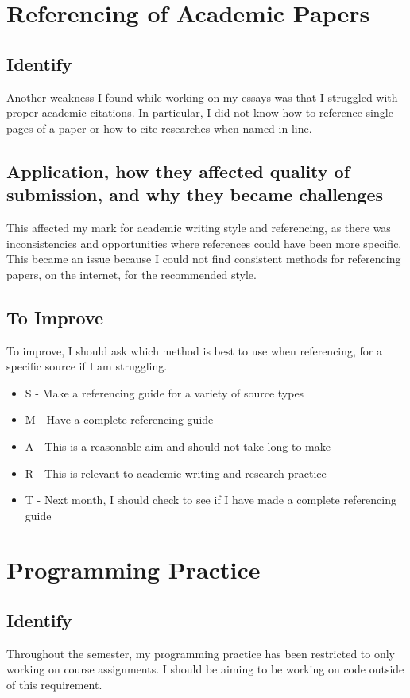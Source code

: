 \documentclass{scrartcl}
\begin{document}
\section*{Referencing of Academic Papers}
\subsection*{Identify}
Another weakness I found while working on my essays was that I struggled with proper academic citations. In particular, I did not know how to reference single pages of a paper or how to cite researches when named in-line.

\subsection*{Application, how they affected quality of submission, and why they became challenges}
This affected my mark for academic writing style and referencing, as there was inconsistencies and opportunities where references could have been more specific. This became an issue because I could not find consistent methods for referencing papers, on the internet, for the recommended style.  

\subsection*{To Improve}
To improve, I should ask which method is best to use when referencing, for a specific source if I am struggling.

 \begin{itemize}
   \item  S - Make a referencing guide for a variety of source types
	\item M - Have a complete referencing guide
	\item A - This is a reasonable aim and should not take long to make
	\item R - This is relevant to academic writing and research practice
	\item T - Next month, I should check to see if I have made a complete referencing guide
 \end{itemize}

\section*{Programming Practice}
\subsection*{Identify}
Throughout the semester, my programming practice has been restricted to only working on course assignments. I should be aiming to be working on code outside of this requirement.
\end{document}
